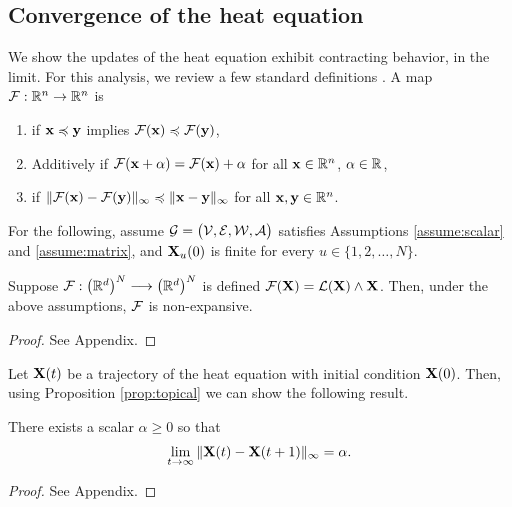 \documentclass[letterpaper, 10 pt, conference]{ieeeconf}
\begin{document}
\subsection{Convergence of the heat equation}
\label{sec:convergence}
We show the updates of the heat equation exhibit contracting behavior, in the limit. 
For this analysis, we review a few standard definitions \cite{gunawardena1995,cochet1999}.
A map $\mathcal{F}: \mathbb{R}^n \to \mathbb{R}^n$ is
    \begin{enumerate}
    \item {} if $\mathbf{x} \preccurlyeq \mathbf{y}$ implies $\mathcal{F}(\mathbf{x}) \preccurlyeq \mathcal{F}(\mathbf{y})$,
    \item Additively  if $\mathcal{F}(\mathbf{x} + \alpha) = \mathcal{F}(\mathbf{x}) + \alpha$ for all $\mathbf{x} \in \mathbb{R}^n$, $\alpha \in \mathbb{R}$,
    \item {} if $\|\mathcal{F}(\mathbf{x}) - \mathcal{F}(\mathbf{y})\|_{\infty} \preccurlyeq \| \mathbf{x} - \mathbf{y} \|_{\infty}$ for all $\mathbf{x}, \mathbf{y} \in \mathbb{R}^n$.
\end{enumerate}

For the following, assume $\mathcal{G} = \bigl(\mathcal{V},\mathcal{E},\mathcal{W},\mathcal{A} \bigr)$ satisfies Assumptions \ref{assume:scalar} and \ref{assume:matrix}, and $\mathbf{X}_u(0)$ is finite for every $u \in \{1,2,\dots, N\}$.

\begin{proposition} \label{prop:topical}
     Suppose $\mathcal{F}: \left(\mathbb{R}^{d}\right)^N \longrightarrow \left(\mathbb{R}^{d}\right)^N$ is defined $\mathcal{F}(\mathbf{X}) = \mathcal{L}(\mathbf{X}) \wedge \mathbf{X}$. Then, under the above assumptions, $\mathcal{F}$ is non-expansive.
\end{proposition}
\begin{proof}
    See Appendix.
\end{proof}

Let $\mathbf{X}(t)$ be a trajectory of the heat equation with initial condition $\mathbf{X}(0)$. Then, using Proposition \ref{prop:topical} we can show the following result.
\begin{theorem} \label{thm:convergence}
There exists a scalar $\alpha\geq 0$ so that
\begin{align*}
    \lim_{t \to \infty} \| \mathbf{X}(t) - \mathbf{X}(t+1) \|_{\infty} = \alpha.
\end{align*}
\end{theorem}
\begin{proof}
See Appendix.
\end{proof}
\end{document}
